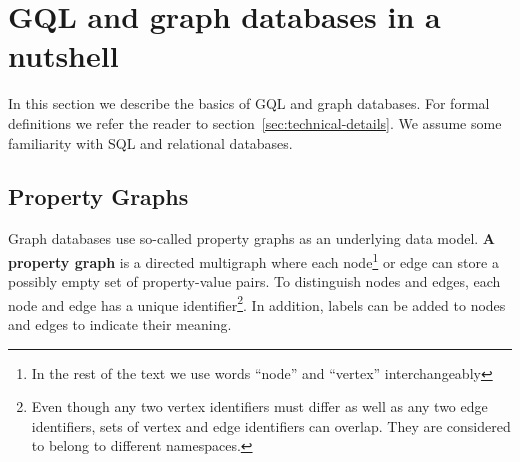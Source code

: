 \documentclass[14pt]{constructor-thesis}
\theoremstyle{definition}
\begin{document}






\section{GQL and graph databases in a nutshell}

In this section we describe the basics of GQL and graph databases. For formal definitions we refer the reader to section~\ref{sec:technical-details}. We assume some familiarity with SQL and relational databases.

\subsection{Property Graphs}
\label{section:intro-property-graphs}

Graph databases use so-called property graphs as an underlying data model. \textbf{A property graph} is a directed multigraph where each node\footnote{In the rest of the text we use words ``node'' and ``vertex'' interchangeably} or edge can store a possibly empty set of property-value pairs. To distinguish nodes and edges, each node and edge has a unique identifier\footnote{Even though any two vertex identifiers must differ as well as any two edge identifiers, sets of vertex and edge identifiers can overlap. They are considered to belong to different namespaces.}. In addition, labels can be added to nodes and edges to indicate their meaning.
\end{document}
